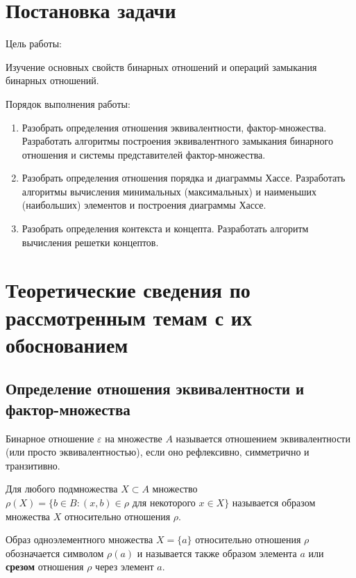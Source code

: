 \documentclass[spec, och, labwork]{shiza}
\begin{document}
\tableofcontents

\section{Постановка задачи}

Цель работы:

Изучение основных свойств бинарных отношений и операций замыкания бинарных отношений.

Порядок выполнения работы:
    \begin{enumerate}
        \item Разобрать определения отношения эквивалентности, фактор-множества. Разработать алгоритмы построения 
        эквивалентного замыкания бинарного отношения и системы представителей фактор-множества.
        \item Разобрать определения отношения порядка и диаграммы Хассе. Разработать алгоритмы вычисления минимальных 
        (максимальных) и наименьших (наибольших) элементов  и построения диаграммы Хассе.
        \item Разобрать определения контекста и концепта. Разработать алгоритм вычисления решетки концептов.
    \end{enumerate}

\section{Теоретические сведения по рассмотренным темам с их обоснованием}

    \subsection{Определение отношения эквивалентности и фактор-множества}

        Бинарное отношение $\varepsilon$ на множестве $A$ называется отношением эквивалентности (или просто эквивалентностью), если оно рефлексивно, симметрично и транзитивно.

        Для любого подмножества $X \subset A$ множество $\rho(X) = \{b \in B: (x, b) \in \rho \text{ для некоторого } x \in X\}$ называется образом множества $X$ относительно отношения $\rho$.

        Образ одноэлементного множества $X = \{a\}$ относительно отношения $\rho$ обозначается символом $\rho(a)$ и называется также образом элемента $a$ или \textbf{срезом} отношения $\rho$ через элемент $a$. 
\end{document}
